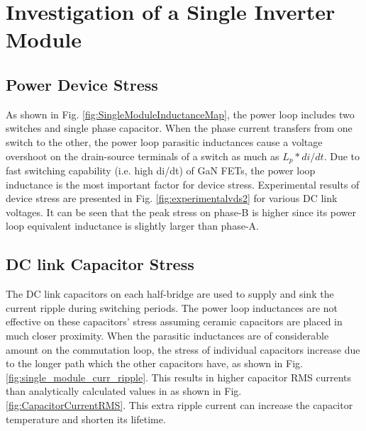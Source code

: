 \section{Investigation of a Single Inverter Module}
\label{chap:curr_driven_rect}

\subsection{Power Device Stress}

As shown in Fig. \ref{fig:SingleModuleInductanceMap}, the power loop includes two switches and single phase capacitor. When the phase current transfers from one switch to the other, the power loop parasitic inductances cause a voltage overshoot on the drain-source terminals of a switch as much as $L_p*di/dt$. Due to fast switching capability (i.e. high di/dt) of GaN FETs, the power loop inductance is the most important factor for device stress. Experimental results of device stress are presented in Fig. \ref{fig:experimentalvds2} for various DC link voltages. It can be seen that the peak stress on phase-B is higher since its power loop equivalent inductance is slightly larger than phase-A.

\subsection{DC link Capacitor Stress}

The DC link capacitors on each half-bridge are used to supply and sink the current ripple during switching periods. The power loop inductances are not effective on these capacitors' stress assuming ceramic capacitors are placed in much closer proximity. When the parasitic inductances are of considerable amount on the commutation loop, the stress of individual capacitors increase due to the longer path which the other capacitors have, as shown in Fig. \ref{fig:single_module_curr_ripple}. This results in higher capacitor RMS currents than analytically calculated values in \cite{Ugur2017} as shown in Fig. \ref{fig:CapacitorCurrentRMS}. This extra ripple current can increase the capacitor temperature and shorten its lifetime. 

